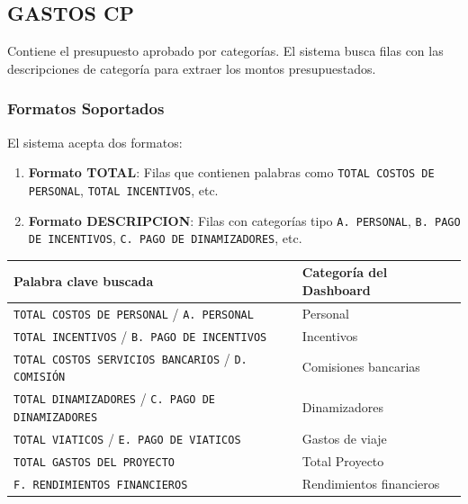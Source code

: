\documentclass[11pt,a4paper]{article}
\begin{document}
\subsection{GASTOS CP}

Contiene el presupuesto aprobado por categorías. El sistema busca filas con las descripciones de categoría para extraer los montos presupuestados.

\subsubsection{Formatos Soportados}

El sistema acepta dos formatos:

\begin{enumerate}[label=\textbf{\alph*)}]
    \item \textbf{Formato TOTAL}: Filas que contienen palabras como \texttt{TOTAL COSTOS DE PERSONAL}, \texttt{TOTAL INCENTIVOS}, etc.
    \item \textbf{Formato DESCRIPCION}: Filas con categorías tipo \texttt{A. PERSONAL}, \texttt{B. PAGO DE INCENTIVOS}, \texttt{C. PAGO DE DINAMIZADORES}, etc.
\end{enumerate}

\begin{center}
\renewcommand{\arraystretch}{1.3}
\begin{tabular}{|l|l|}
\hline
\rowcolor{verde!15}
\textbf{Palabra clave buscada} & \textbf{Categoría del Dashboard} \\
\hline
\texttt{TOTAL COSTOS DE PERSONAL} / \texttt{A. PERSONAL} & Personal \\
\hline
\texttt{TOTAL INCENTIVOS} / \texttt{B. PAGO DE INCENTIVOS} & Incentivos \\
\hline
\texttt{TOTAL COSTOS SERVICIOS BANCARIOS} / \texttt{D. COMISI\'{O}N} & Comisiones bancarias \\
\hline
\texttt{TOTAL DINAMIZADORES} / \texttt{C. PAGO DE DINAMIZADORES} & Dinamizadores \\
\hline
\texttt{TOTAL VIATICOS} / \texttt{E. PAGO DE VIATICOS} & Gastos de viaje \\
\hline
\texttt{TOTAL GASTOS DEL PROYECTO} & Total Proyecto \\
\hline
\texttt{F. RENDIMIENTOS FINANCIEROS} & Rendimientos financieros \\
\hline
\end{tabular}
\end{center}

\end{document}
